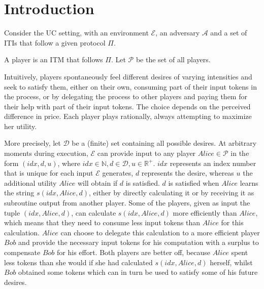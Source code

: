 \section{Introduction}
  Consider the UC setting, with an environment $\mathcal{E}$, an adversary $\mathcal{A}$ and a set of ITIs that follow a
  given protocol $\Pi$.

  \begin{definition}[Player]
    A player is an ITM that follows $\Pi$. Let $\mathcal{P}$ be the set of all players.
  \end{definition}

  Intuitively, players spontaneously feel different desires of varying intensities and seek to satisfy them, either on their
  own, consuming part of their input tokens in the process, or by delegating the process to other players and paying them for
  their help with part of their input tokens. The choice depends on the perceived difference in price. Each player plays
  rationally, always attempting to maximize her utility.
  
  More precisely, let $\mathcal{D}$ be a (finite) set containing all possible desires. At arbitrary moments during execution,
  $\mathcal{E}$ can provide input to any player $Alice \in \mathcal{P}$ in the form $\left(idx, d, u\right)$, where $idx
  \in \mathbb{N}, d \in \mathcal{D}, u \in \mathbb{R}^{+}$. $idx$ represents an index number that is unique for each input
  $\mathcal{E}$ generates, $d$ represents the desire, whereas $u$ the additional utility $Alice$ will obtain if $d$ is
  satisfied. $d$ is satisfied when $Alice$ learns the string $s\left(idx, Alice, d\right)$, either by directly calculating
  it or by receiving it as subroutine output from another player. Some of the players, given as input the tuple $\left(idx,
  Alice, d\right)$, can calculate $s\left(idx, Alice, d\right)$ more efficiently than $Alice$, which means that they need
  to consume less input tokens than $Alice$ for this calculation. $Alice$ can choose to delegate this calculation to a more
  efficient player $Bob$ and provide the necessary input tokens for his computation with a surplus to compensate $Bob$ for
  his effort. Both players are better off, because $Alice$ spent less tokens than she would if she had calculated
  $s\left(idx, Alice, d\right)$ herself, whilst $Bob$ obtained some tokens which can in turn be used to satisfy some of his
  future desires.

